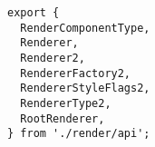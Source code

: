 \begin{verbatim}
export {
  RenderComponentType,
  Renderer,
  Renderer2,
  RendererFactory2,
  RendererStyleFlags2,
  RendererType2,
  RootRenderer,
} from './render/api';
\end{verbatim}
